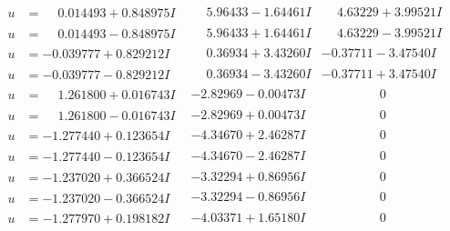 \documentclass[1p]{elsarticle_modified}
\theoremstyle{definition}
\begin{document}
$$\begin{array}{c|c|c}
\begin{aligned}
u &= \phantom{-}0.014493 + 0.848975 I\end{aligned}
 & \phantom{-}5.96433 - 1.64461 I & \phantom{-}4.63229 + 3.99521 I \\ \hline\begin{aligned}
u &= \phantom{-}0.014493 - 0.848975 I\end{aligned}
 & \phantom{-}5.96433 + 1.64461 I & \phantom{-}4.63229 - 3.99521 I \\ \hline\begin{aligned}
u &= -0.039777 + 0.829212 I\end{aligned}
 & \phantom{-}0.36934 + 3.43260 I & -0.37711 - 3.47540 I \\ \hline\begin{aligned}
u &= -0.039777 - 0.829212 I\end{aligned}
 & \phantom{-}0.36934 - 3.43260 I & -0.37711 + 3.47540 I \\ \hline\begin{aligned}
u &= \phantom{-}1.261800 + 0.016743 I\end{aligned}
 & -2.82969 - 0.00473 I & \phantom{-0.000000 } 0 \\ \hline\begin{aligned}
u &= \phantom{-}1.261800 - 0.016743 I\end{aligned}
 & -2.82969 + 0.00473 I & \phantom{-0.000000 } 0 \\ \hline\begin{aligned}
u &= -1.277440 + 0.123654 I\end{aligned}
 & -4.34670 + 2.46287 I & \phantom{-0.000000 } 0 \\ \hline\begin{aligned}
u &= -1.277440 - 0.123654 I\end{aligned}
 & -4.34670 - 2.46287 I & \phantom{-0.000000 } 0 \\ \hline\begin{aligned}
u &= -1.237020 + 0.366524 I\end{aligned}
 & -3.32294 + 0.86956 I & \phantom{-0.000000 } 0 \\ \hline\begin{aligned}
u &= -1.237020 - 0.366524 I\end{aligned}
 & -3.32294 - 0.86956 I & \phantom{-0.000000 } 0 \\ \hline\begin{aligned}
u &= -1.277970 + 0.198182 I\end{aligned}
 & -4.03371 + 1.65180 I & \phantom{-0.000000 } 0 \\ \hline\begin{aligned}

\end{aligned}
\end{array}$$
\end{document}
